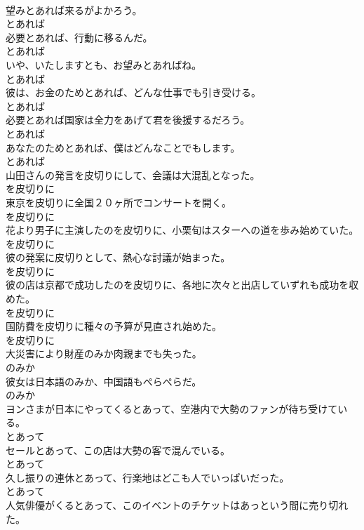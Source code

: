 \documentclass[8pt]{extreport}
\begin{document}
\begin{CJK}{UTF8}{min}
\\	望みとあれば来るがよかろう。	
\\	とあれば	
\\	必要とあれば、行動に移るんだ。	
\\	とあれば	
\\	いや、いたしますとも、お望みとあればね。	
\\	とあれば	
\\	彼は、お金のためとあれば、どんな仕事でも引き受ける。	
\\	とあれば	
\\	必要とあれば国家は全力をあげて君を後援するだろう。	
\\	とあれば	
\\	あなたのためとあれば、僕はどんなことでもします。	
\\	とあれば	
\\	山田さんの発言を皮切りにして、会議は大混乱となった。	
\\	を皮切りに	
\\	東京を皮切りに全国２０ヶ所でコンサートを開く。	
\\	を皮切りに	
\\	花より男子に主演したのを皮切りに、小栗旬はスターへの道を歩み始めていた。	
\\	を皮切りに	
\\	彼の発案に皮切りとして、熱心な討議が始まった。	
\\	を皮切りに	
\\	彼の店は京都で成功したのを皮切りに、各地に次々と出店していずれも成功を収めた。	
\\	を皮切りに	
\\	国防費を皮切りに種々の予算が見直され始めた。	
\\	を皮切りに	
\\	大災害により財産のみか肉親までも失った。	
\\	のみか	
\\	彼女は日本語のみか、中国語もぺらぺらだ。	
\\	のみか	
\\	ヨンさまが日本にやってくるとあって、空港内で大勢のファンが待ち受けている。	
\\	とあって	
\\	セールとあって、この店は大勢の客で混んでいる。	
\\	とあって	
\\	久し振りの連休とあって、行楽地はどこも人でいっぱいだった。	
\\	とあって	
\\	人気俳優がくるとあって、このイベントのチケットはあっという間に売り切れた。	

\end{CJK}
\end{document}
